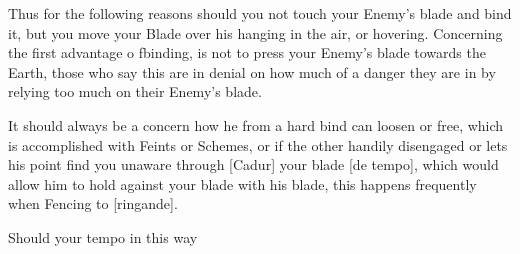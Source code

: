 Thus for the following reasons should you not touch your Enemy's blade
and bind it, but you move your Blade over his hanging in the
air, or hovering. Concerning the first
advantage o fbinding, is not to press your Enemy's blade
towards the Earth, those who say this are in denial on how much of a
danger they are in by relying too much on their Enemy's blade. 

It should always be a concern how he from a hard bind can loosen or
free, which is accomplished with Feints or Schemes, or if the other
handily disengaged or lets his point find you unaware through [Cadur]
your blade [de tempo], which would allow him to hold against your
blade with his blade, this happens frequently when Fencing to
[ringande].

Should your tempo in this way